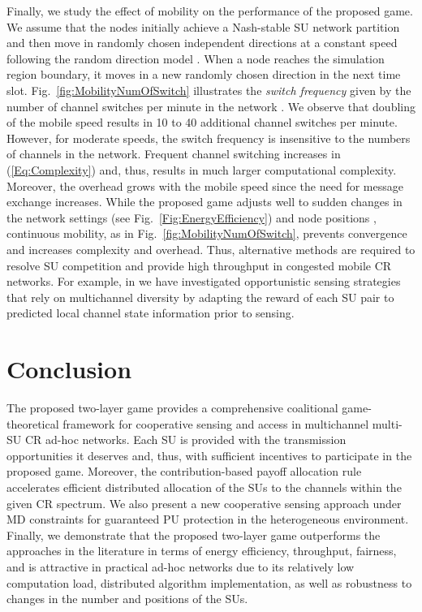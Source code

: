 \documentclass[journal,draftclsnofoot,onecolumn]{IEEEtran}
\theoremstyle{definition}
\begin{document}
Finally, we study the effect of mobility on the performance of the proposed game. We assume that the nodes initially achieve a Nash-stable SU network partition and then move in randomly chosen independent directions at a constant speed  following the random direction model \cite{MobilityModel}. When a node reaches the simulation region boundary, it moves in a new randomly chosen direction in the next time slot. Fig.~\ref{fig:MobilityNumOfSwitch} illustrates the \textit{switch frequency} given by the number of channel switches per minute in the network \cite{ZHanCoalSenseGame}. We observe that doubling of the mobile speed  results in 10 to 40 additional channel switches per minute. However, for moderate speeds, the switch frequency is insensitive to the numbers of channels in the network. Frequent channel switching increases  in (\ref{Eq:Complexity}) and, thus, results in much larger  computational complexity. Moreover, the overhead grows with the mobile speed since the need for message exchange increases. While the proposed game adjusts well to sudden changes in the network settings (see Fig.~\ref{Fig:EnergyEfficiency}) and node positions \cite{YLuThesis}, continuous mobility, as in Fig.~\ref{fig:MobilityNumOfSwitch}, prevents convergence and increases complexity and overhead. Thus, alternative methods are required to resolve SU competition and provide high throughput in congested mobile CR networks. For example, in \cite{YLuTVT,YLuAllerton} we have investigated opportunistic sensing strategies that rely on multichannel diversity by adapting the reward of each SU pair to predicted local channel state information prior to sensing.

\section{Conclusion}\label{Sec:Conclusion}
The proposed two-layer game provides a comprehensive coalitional game-theoretical framework for cooperative sensing and access in multichannel multi-SU CR ad-hoc networks. Each SU is provided with the transmission opportunities it deserves and, thus, with sufficient incentives to participate in the proposed game.	Moreover, the contribution-based payoff allocation rule accelerates efficient distributed allocation of the SUs to the channels within the given CR spectrum. We also present a new cooperative sensing approach under MD constraints for guaranteed PU protection in the heterogeneous environment. Finally, we demonstrate that the proposed two-layer game outperforms the approaches in the literature in terms of energy efficiency, throughput, fairness, and is attractive in practical ad-hoc networks due to its relatively low computation load, distributed algorithm implementation, as well as robustness to changes in the number and positions of the SUs.
\end{document}
